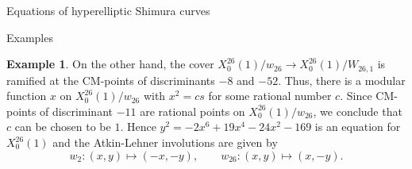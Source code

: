 \documentclass{amsart}
\newcounter{lemma}
\theoremstyle{definition}
\newtheorem{Example}[lemma]{Example}
\begin{document}
\begin{section}{Equations of hyperelliptic Shimura curves}
\begin{subsection}{Examples}
\begin{Example}
  On the other hand, the cover $X_0^{26}(1)/w_{26}\to
  X_0^{26}(1)/W_{26,1}$ is ramified at the CM-points of discriminants
  $-8$ and $-52$. Thus, there is a modular function $x$ on
  $X_0^{26}(1)/w_{26}$ with $x^2=cs$ for some rational number
  $c$. Since CM-points of discriminant $-11$ are rational points on
  $X_0^{26}(1)/w_{26}$, we conclude that $c$ can be chosen to be $1$.
  Hence $y^2=-2x^6+19x^4-24x^2-169$ is an equation for $X_0^{26}(1)$ and the Atkin-Lehner involutions are given by
  $$
    w_{2}:(x,y)\mapsto\left(-x, -y\right), \qquad
    w_{26}:(x,y)\mapsto(x,-y).
  $$
\end{Example}



\end{subsection}
\end{section}
\end{document}

